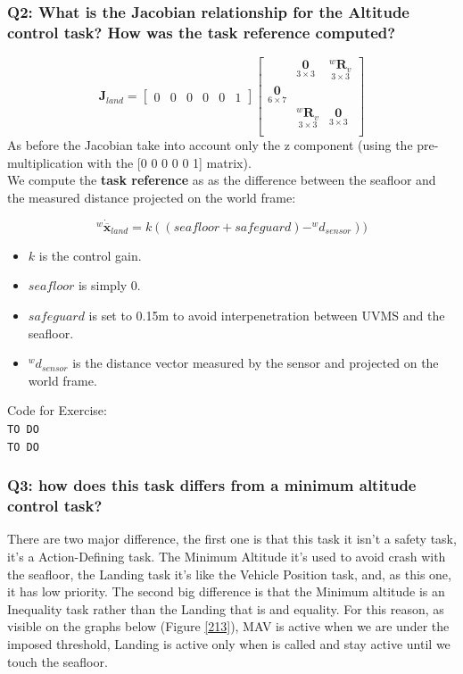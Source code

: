 \documentclass{article}
\begin{document}
\subsubsection{Q2: What is the Jacobian relationship for the Altitude control task? How was the task reference computed?}

\begin{equation}
\boldsymbol{J}_{land}=\begin{bmatrix} 0 & 0 & 0 & 0 & 0 & 1
\end{bmatrix}
    \begin{bmatrix}
     & \underset{3\times 3}{\boldsymbol{0}} & \underset{ 3\times 3}{^{w}\boldsymbol{R}_{v}} \\
     \underset{6\times 7}{\boldsymbol{0}} \\
     & \underset{ 3\times 3}{^{w}\boldsymbol{R}_{v}} & \underset{3\times 3}{\boldsymbol{0}} \\
    \end{bmatrix}
\end{equation}
As before the Jacobian take into account only the z component (using the pre-multiplication with the [0 0 0 0 0 1] matrix). 
\\
We compute the \textbf{task reference} as as the difference between the seafloor and the measured distance projected on the world frame:

\begin{equation}
    ^{w}\dot{\overline{\boldsymbol{x}}}_{land} = k((seafloor + safeguard) - ^w d_{sensor})) %
\end{equation}
\begin{itemize}
    \item $k$ is the control gain.
    \item $seafloor$ is simply 0.
    \item $safeguard$ is set to 0.15m  to avoid interpenetration between UVMS and the seafloor.
    \item $^w d_{sensor}$ is the distance vector measured by the sensor and projected on the world frame.
\end{itemize} 

\colorbox{mygray}{\parbox{0.9\textwidth}{Code for Exercise: \\
\texttt{TO DO}\\
\texttt{TO DO}
}}

\subsubsection{Q3: how does this task differs from a minimum altitude control task?}
There are two major difference, the first one is that this task it isn't a safety task, it's a Action-Defining task. The Minimum Altitude it's used to avoid crash with the seafloor, the Landing task it's like the Vehicle Position task, and, as this one, it has low priority.
The second big difference is that the Minimum altitude is an Inequality task rather than the Landing that is and equality. For this reason, as visible on the graphs below (Figure \ref{213}), MAV is active when we are under the imposed threshold, Landing is active only when is called and stay active until we touch the seafloor.
\end{document}
